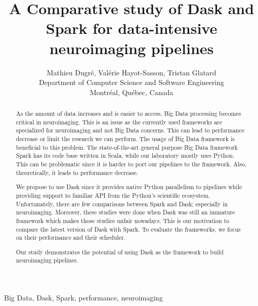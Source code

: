 \documentclass[conference]{IEEEtran}
\begin{document}
\title{A Comparative study of Dask and Spark for data-intensive neuroimaging pipelines}

\author{Mathieu Dugr\'e, Val\'erie Hayot-Sasson, Tristan Glatard\\
Department of Computer Science and Software Engineering\\
Montr\'eal, Qu\'ebec, Canada
}

\maketitle

\begin{abstract}
As the amount of data increases and is easier to access, Big Data processing becomes
critical in neuroimaging.
This is an issue as the currently used frameworks are specialized for neuroimaging
and not Big Data concerns. This can lead to performance decrease or limit the
research we can perform.
The usage of Big Data framework is beneficial to this problem. The state-of-the-art
general purpose Big Data framework Spark has its code base written in Scala, while
our laboratory mostly uses Python. This can be problematic since it is harder to port
our pipelines to the framework. Also, theoretically, it leads to performance decrease.

We propose to use Dask since it provides native Python parallelism to pipelines while
providing support to familiar API from the Python's scientific ecosystem.
Unfortunately, there are few comparisons between Spark and Dask; especially in
neuroimaging. Moreover, these studies were done when Dask was still an immature
framework which makes those studies unfair nowadays. This is our motivation to
compare the latest version of Dask with Spark.
To evaluate the frameworks, we focus on their performance and their scheduler.

Our study demonstrates the potential of using Dask as the framework to build
neuroimaging pipelines.
\end{abstract}

\begin{IEEEkeywords}
Big Data, Dask, Spark, performance, neuroimaging
\end{IEEEkeywords}
\end{document}
